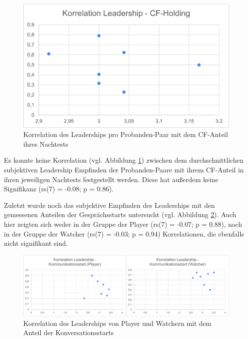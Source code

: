 \begin{figure}[ht]
\centering
\includegraphics[width=1\linewidth]{content/pictures/korrelation_leadership_cfh.png}
\caption{Korrelation des Leaderships pro Probanden-Paar mit dem \ac{CF}-Anteil ihres Nachtests}
\label{fig:correlation_leadership_cfh}
\end{figure}

Es konnte keine Korrelation (vgl. Abbildung \ref{fig:correlation_leadership_cfh}) zwischen dem durchschnittlichen subjektiven Leadership Empfinden der Probanden-Paare mit ihrem \ac{CF}-Anteil in ihren jeweiligen Nachtests festgestellt werden. Diese hat außerdem keine Signifikanz (rs(7) = -0.08; p = 0.86).

Zuletzt wurde noch das subjektive Empfinden des Leaderships mit den gemessenen Anteilen der Gesprächsstarts untersucht (vgl. Abbildung \ref{fig:correlation_leadership_conversation_starts}). Auch hier zeigten sich weder in der Gruppe der Player (rs(7) = -0.07; p = 0.88), noch in der Gruppe der Watcher (rs(7) = -0.03; p = 0.94) Korrelationen, die ebenfalls nicht signifikant sind. 

\begin{figure}[ht]
\centering
\includegraphics[width=1\linewidth]{content/pictures/Korrelation_Leaderhip_Start_of_conversation.png}
\caption{Korrelation des Leaderships von Player und Watchern mit dem Anteil der Konversationsstarts}
\label{fig:correlation_leadership_conversation_starts}
\end{figure}

